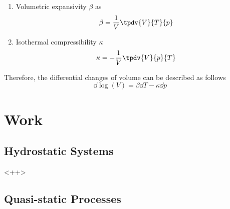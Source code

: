 \documentclass[../qm.tex]{subfiles}
\begin{document}
\begin{enumerate}
\item Volumetric expansivity $\beta$ as
	\begin{equation}
		\beta=\frac{1}{V}\tpdv{V}{T}{p}
		\label{eq:volumeexp.temp}
	\end{equation}
\item Isothermal compressibility $\kappa$
	\begin{equation}
		\kappa=-\frac{1}{V}\tpdv{V}{p}{T}
		\label{eq:isothcomp.temp}
	\end{equation}
\end{enumerate}
Therefore, the differential changes of volume can be described as follows
\begin{equation}
	\dd\log\left( V \right)=\beta\dd T-\kappa\dd p
	\label{eq:volchange.temp}
\end{equation}
\section{Work}
\subsection{Hydrostatic Systems}
<++>
\subsection{Quasi-static Processes}
\end{document}

